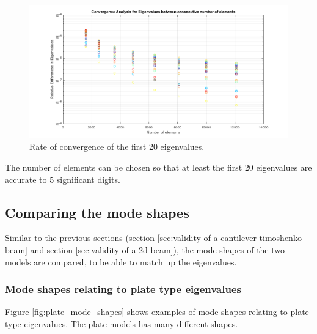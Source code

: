\documentclass[../../main.tex]{subfiles}
\begin{document}
\begin{figure}[H]
    \centering
    \begin{adjustbox}{center}
        \includegraphics[scale=0.7]{Plate accuracy_no_legend.png}
    \end{adjustbox}
    \caption{Rate of convergence of the first 20 eigenvalues.}
    \label{fig:conv_3d_eig}
\end{figure}

The number of elements can be chosen so that at least the first 20 eigenvalues are accurate to 5 significant digits.

\subsection{Comparing the mode shapes}
Similar to the previous sections (section \ref{sec:validity-of-a-cantilever-timoshenko-beam} and section \ref{sec:validity-of-a-2d-beam}), the mode shapes of the two models are compared, to be able to match up the eigenvalues.

\subsubsection{Mode shapes relating to plate type eigenvalues}
Figure \ref{fig:plate_mode_shapes} shows examples of mode shapes relating to plate-type eigenvalues. The plate models has many different shapes.
\end{document}
